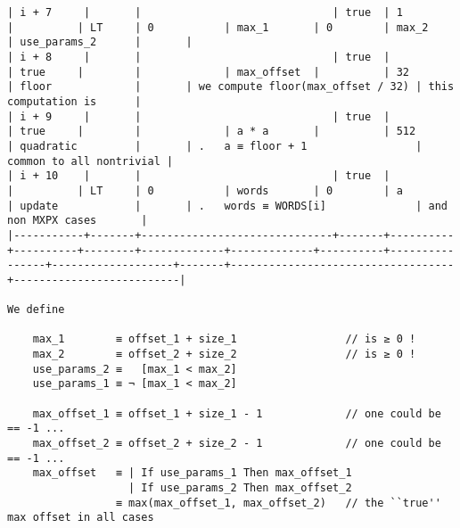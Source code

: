 \documentclass[varwidth=\maxdimen,margin=0.5cm,multi={verbatim}]{standalone}
\begin{document}
\begin{verbatim}
| i + 7     |       |                              | true  | 1        |          | LT     | 0           | max_1       | 0        | max_2          | use_params_2      |       |
| i + 8     |       |                              | true  |          | true     |        |             | max_offset  |          | 32             | floor             |       | we compute floor(max_offset / 32) | this computation is      |
| i + 9     |       |                              | true  |          | true     |        |             | a * a       |          | 512            | quadratic         |       | .   a ≡ floor + 1                 | common to all nontrivial |
| i + 10    |       |                              | true  |          |          | LT     | 0           | words       | 0        | a              | update            |       | .   words ≡ WORDS[i]              | and non MXPX cases       |
|-----------+-------+------------------------------+-------+----------+----------+--------+-------------+-------------+----------+----------------+-------------------+-------+-----------------------------------+--------------------------|

We define

    max_1        ≡ offset_1 + size_1                 // is ≥ 0 !
    max_2        ≡ offset_2 + size_2                 // is ≥ 0 !
    use_params_2 ≡   [max_1 < max_2]
    use_params_1 ≡ ¬ [max_1 < max_2]

    max_offset_1 ≡ offset_1 + size_1 - 1             // one could be == -1 ...
    max_offset_2 ≡ offset_2 + size_2 - 1             // one could be == -1 ...
    max_offset   ≡ | If use_params_1 Then max_offset_1
                   | If use_params_2 Then max_offset_2
                 ≡ max(max_offset_1, max_offset_2)   // the ``true'' max offset in all cases

\end{verbatim}
\end{document}
